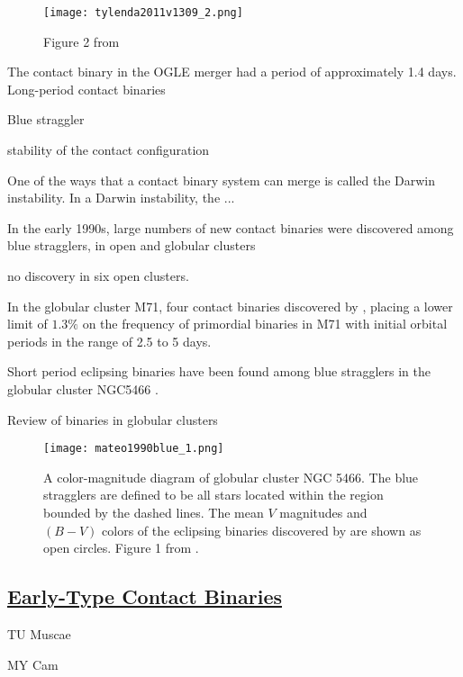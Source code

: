 \documentclass[12pt]{article} %
\numberwithin{equation}{section} %
\begin{document}
\begin{figure}[H]
\centering
\texttt{[image: tylenda2011v1309\_2.png]}
\caption{Figure 2 from \citet{tylenda2011v1309}}
\label{fig: tylenda2011v1309_2}
\end{figure}


The contact binary in the OGLE merger had a period of approximately 1.4 days. Long-period contact binaries \citep{rucinski1998eclipsing} 

Blue straggler \citet{andronov2006mergers}

stability of the contact configuration \citep{rasio1995minimum}

One of the ways that a contact binary system can merge is called the Darwin instability. In a Darwin instability, the ...

In the early 1990s, large numbers of new contact binaries were discovered among blue stragglers, in open and globular clusters 

\citep{kaluzny1988ccd} no discovery in six open clusters.

In the globular cluster M71, four contact binaries discovered by \citet{yan1994primordial}, placing a lower limit of $1.3\%$ on the frequency of primordial binaries in M71 with initial orbital periods in the range of 2.5 to 5 days. 

Short period eclipsing binaries have been found among blue stragglers in the globular cluster NGC5466 \citep{mateo1990blue}.

Review of binaries in globular clusters \citep{hut1990binaries}

\begin{figure}[H]
\centering
\texttt{[image: mateo1990blue\_1.png]}
\caption{A color-magnitude diagram of globular cluster NGC 5466. The blue stragglers are defined to be all stars located within the region bounded by the dashed lines. The mean $V$ magnitudes and $(B - V)$ colors of the eclipsing binaries discovered by \citet{mateo1990blue} are shown as open circles. Figure 1 from \citet{mateo1990blue}.}
\label{fig: mateo1990blue_1}
\end{figure}

\subsection[Early-Type Contact Binaries]{\hyperlink{to}{Early-Type Contact Binaries}}

TU Muscae \citep{penny2008tomographic}

MY Cam \citep{lorenzo2014my}
\end{document}
